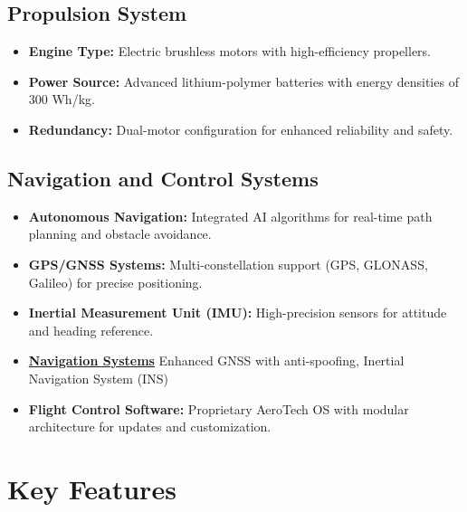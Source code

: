 \documentclass{article}
\begin{document}
\subsection{Propulsion System}
\begin{itemize}
    \item \textbf{Engine Type:} Electric brushless motors with high-efficiency propellers.
    \item \textbf{Power Source:} Advanced lithium-polymer batteries with energy densities of 300 Wh/kg.
    \item \textbf{Redundancy:} Dual-motor configuration for enhanced reliability and safety.
\end{itemize}

\subsection{Navigation and Control Systems}
\begin{itemize}
    \item \textbf{Autonomous Navigation:} Integrated AI algorithms for real-time path planning and obstacle avoidance.
    \item \textbf{GPS/GNSS Systems:} Multi-constellation support (GPS, GLONASS, Galileo) for precise positioning.
    \item \textbf{Inertial Measurement Unit (IMU):} High-precision sensors for attitude and heading reference.
    \item \textbf{\underline{Navigation Systems}} Enhanced GNSS with anti-spooﬁng, Inertial Navigation System (INS)
    \item \textbf{Flight Control Software:} Proprietary AeroTech OS with modular architecture for updates and customization.
\end{itemize}

\section{Key Features}
\end{document}
